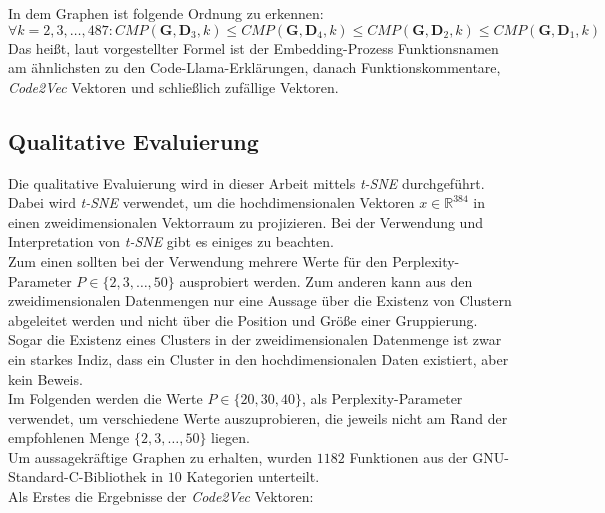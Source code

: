 \documentclass[12pt,letterpaper,ngerman]{article}
\begin{document}
In dem Graphen ist folgende Ordnung zu erkennen: 
\[ 
  \forall k=2,3,\dots,487: CMP(\mathbf{G}, \mathbf{D}_3,k) \leq 
    CMP(\mathbf{G}, \mathbf{D}_4, k) \leq 
    CMP(\mathbf{G}, \mathbf{D}_2, k) \leq 
    CMP(\mathbf{G}, \mathbf{D}_1, k)
\]
Das heißt, laut vorgestellter Formel ist der Embedding-Prozess
Funktionsnamen am ähnlichsten zu den Code-Llama-Erklärungen, 
danach Funktionskommentare, \textit{Code2Vec} Vektoren und 
schließlich zufällige Vektoren.
\pagebreak
\subsection{Qualitative Evaluierung} 
Die qualitative Evaluierung wird in dieser Arbeit mittels
\textit{t-SNE} durchgeführt. Dabei wird \textit{t-SNE} verwendet,
um die hochdimensionalen Vektoren $x \in \mathbb{R}^{384}$ in einen
zweidimensionalen Vektorraum zu projizieren. Bei der Verwendung und 
Interpretation von \textit{t-SNE} gibt es einiges zu beachten. \\
Zum einen sollten bei der Verwendung mehrere Werte für den
Perplexity-Parameter $P \in \{2,3,\dots ,50\}$ ausprobiert werden. 
Zum anderen kann aus den zweidimensionalen Datenmengen nur eine Aussage
über die Existenz von Clustern abgeleitet werden und nicht über die
Position und Größe einer Gruppierung. Sogar die Existenz eines Clusters 
in der zweidimensionalen Datenmenge ist zwar ein starkes Indiz,
dass ein Cluster in den hochdimensionalen Daten existiert, 
aber kein Beweis.\\
Im Folgenden werden die Werte $P \in \{20, 30, 40\}$, 
als Perplexity-Parameter verwendet, um verschiedene Werte auszuprobieren,
die jeweils nicht am Rand der empfohlenen Menge $\{2,3, \dots, 50\}$ liegen.\\ 
Um aussagekräftige Graphen zu erhalten, wurden $1182$ Funktionen aus der
GNU-Standard-C-Bibliothek in $10$ Kategorien unterteilt.\\
Als Erstes die Ergebnisse der \textit{Code2Vec} Vektoren:
\end{document}

